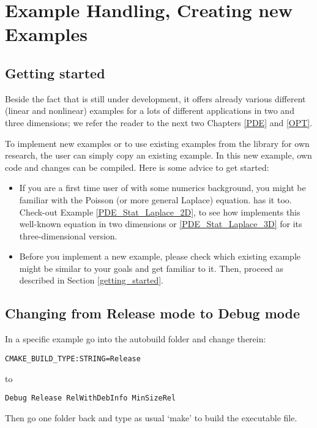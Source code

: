\chapter{Example Handling, Creating new Examples}
\label{chap:howtoex}
\section{Getting started}
Beside the fact that \dope{} is still under development,
it offers already various different (linear and nonlinear) 
examples for a lots 
of different applications in two and three dimensions; 
we refer the reader to the 
next two Chapters \ref{PDE} and \ref{OPT}. 

To implement new examples or to use existing examples 
from the library for own research, the user 
can simply copy an existing example. In this 
new example, own code and changes can be compiled. Here is some 
advice to get started:
\begin{itemize}
\item If you are a first time user of \dope{} 
with some numerics background, you 
might be familiar with the Poisson (or more general Laplace) equation.
\dope{} has it too. Check-out Example \ref{PDE_Stat_Laplace_2D},
to see how \dope{} implements this well-known equation in two
dimensions or \ref{PDE_Stat_Laplace_3D} for its three-dimensional version.
\item Before you implement a new example, please check which 
existing example might be similar to your goals and get familiar 
to it. Then, proceed as described in Section \ref{getting_started}. 
\end{itemize}

\section{Changing from Release mode to Debug mode}
In a specific example go into the autobuild folder 
and change therein:
\begin{lstlisting}
CMAKE_BUILD_TYPE:STRING=Release
\end{lstlisting}
to 
\begin{lstlisting}
Debug Release RelWithDebInfo MinSizeRel
\end{lstlisting}
Then go one folder back and type as usual `make' to build the executable file.




